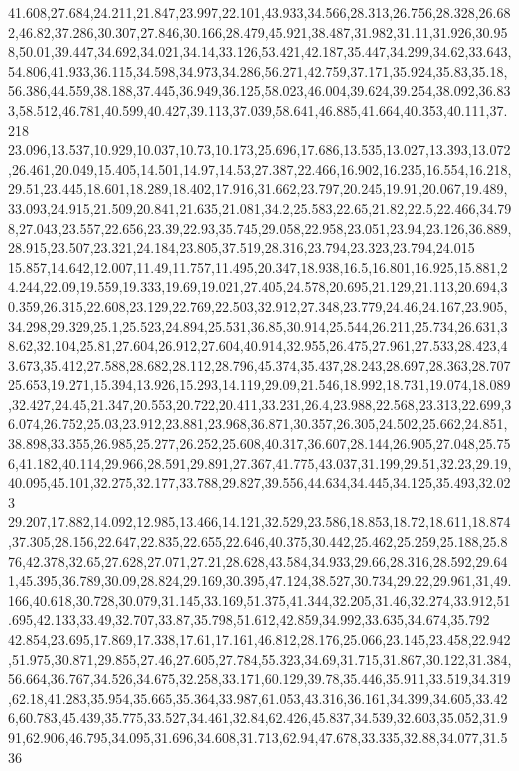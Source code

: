41.608,27.684,24.211,21.847,23.997,22.101,43.933,34.566,28.313,26.756,28.328,26.682,46.82,37.286,30.307,27.846,30.166,28.479,45.921,38.487,31.982,31.11,31.926,30.958,50.01,39.447,34.692,34.021,34.14,33.126,53.421,42.187,35.447,34.299,34.62,33.643,54.806,41.933,36.115,34.598,34.973,34.286,56.271,42.759,37.171,35.924,35.83,35.18,56.386,44.559,38.188,37.445,36.949,36.125,58.023,46.004,39.624,39.254,38.092,36.833,58.512,46.781,40.599,40.427,39.113,37.039,58.641,46.885,41.664,40.353,40.111,37.218
23.096,13.537,10.929,10.037,10.73,10.173,25.696,17.686,13.535,13.027,13.393,13.072,26.461,20.049,15.405,14.501,14.97,14.53,27.387,22.466,16.902,16.235,16.554,16.218,29.51,23.445,18.601,18.289,18.402,17.916,31.662,23.797,20.245,19.91,20.067,19.489,33.093,24.915,21.509,20.841,21.635,21.081,34.2,25.583,22.65,21.82,22.5,22.466,34.798,27.043,23.557,22.656,23.39,22.93,35.745,29.058,22.958,23.051,23.94,23.126,36.889,28.915,23.507,23.321,24.184,23.805,37.519,28.316,23.794,23.323,23.794,24.015
15.857,14.642,12.007,11.49,11.757,11.495,20.347,18.938,16.5,16.801,16.925,15.881,24.244,22.09,19.559,19.333,19.69,19.021,27.405,24.578,20.695,21.129,21.113,20.694,30.359,26.315,22.608,23.129,22.769,22.503,32.912,27.348,23.779,24.46,24.167,23.905,34.298,29.329,25.1,25.523,24.894,25.531,36.85,30.914,25.544,26.211,25.734,26.631,38.62,32.104,25.81,27.604,26.912,27.604,40.914,32.955,26.475,27.961,27.533,28.423,43.673,35.412,27.588,28.682,28.112,28.796,45.374,35.437,28.243,28.697,28.363,28.707
25.653,19.271,15.394,13.926,15.293,14.119,29.09,21.546,18.992,18.731,19.074,18.089,32.427,24.45,21.347,20.553,20.722,20.411,33.231,26.4,23.988,22.568,23.313,22.699,36.074,26.752,25.03,23.912,23.881,23.968,36.871,30.357,26.305,24.502,25.662,24.851,38.898,33.355,26.985,25.277,26.252,25.608,40.317,36.607,28.144,26.905,27.048,25.756,41.182,40.114,29.966,28.591,29.891,27.367,41.775,43.037,31.199,29.51,32.23,29.19,40.095,45.101,32.275,32.177,33.788,29.827,39.556,44.634,34.445,34.125,35.493,32.023
29.207,17.882,14.092,12.985,13.466,14.121,32.529,23.586,18.853,18.72,18.611,18.874,37.305,28.156,22.647,22.835,22.655,22.646,40.375,30.442,25.462,25.259,25.188,25.876,42.378,32.65,27.628,27.071,27.21,28.628,43.584,34.933,29.66,28.316,28.592,29.641,45.395,36.789,30.09,28.824,29.169,30.395,47.124,38.527,30.734,29.22,29.961,31,49.166,40.618,30.728,30.079,31.145,33.169,51.375,41.344,32.205,31.46,32.274,33.912,51.695,42.133,33.49,32.707,33.87,35.798,51.612,42.859,34.992,33.635,34.674,35.792
42.854,23.695,17.869,17.338,17.61,17.161,46.812,28.176,25.066,23.145,23.458,22.942,51.975,30.871,29.855,27.46,27.605,27.784,55.323,34.69,31.715,31.867,30.122,31.384,56.664,36.767,34.526,34.675,32.258,33.171,60.129,39.78,35.446,35.911,33.519,34.319,62.18,41.283,35.954,35.665,35.364,33.987,61.053,43.316,36.161,34.399,34.605,33.426,60.783,45.439,35.775,33.527,34.461,32.84,62.426,45.837,34.539,32.603,35.052,31.991,62.906,46.795,34.095,31.696,34.608,31.713,62.94,47.678,33.335,32.88,34.077,31.536

